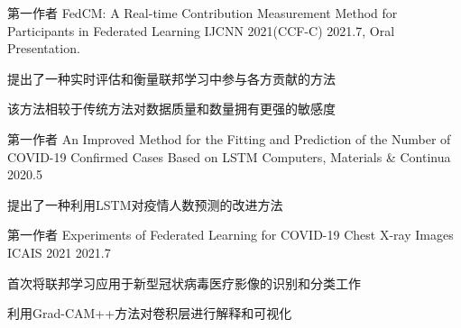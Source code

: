 

\begin{cventries}
	\cventry
	{第一作者} %
	{FedCM: A Real-time Contribution Measurement Method for Participants in Federated Learning} %
	{IJCNN 2021(CCF-C)} %
	{2021.7, Oral Presentation.} %
	{
		\begin{cvitems} %
			\item {提出了一种实时评估和衡量联邦学习中参与各方贡献的方法}
			\item {该方法相较于传统方法对数据质量和数量拥有更强的敏感度}
		\end{cvitems}
	}

	\cventry
	{第一作者} %
	{An Improved Method for the Fitting and Prediction of the Number of COVID-19 Confirmed Cases Based on LSTM} %
	{Computers, Materials \& Continua} %
	{2020.5} %
	{
		\begin{cvitems} %
			\item {提出了一种利用LSTM对疫情人数预测的改进方法}
		\end{cvitems}
	}

	\cventry
	{第一作者} %
	{Experiments of Federated Learning for COVID-19 Chest X-ray Images} %
	{ICAIS 2021} %
	{2021.7} %
	{
		\begin{cvitems} %
			\item {首次将联邦学习应用于新型冠状病毒医疗影像的识别和分类工作}
			\item {利用Grad-CAM++方法对卷积层进行解释和可视化}
		\end{cvitems}
	}

\end{cventries}
